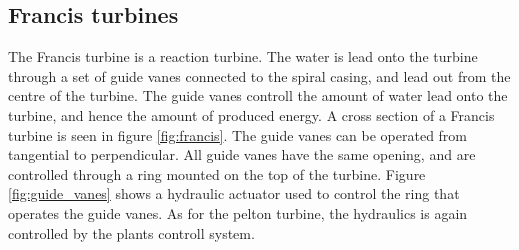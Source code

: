         
    
    \subsection{Francis turbines}\label{subsec:francis}
        The Francis turbine is a reaction turbine. The water is lead onto the turbine through a set of guide vanes connected to the spiral casing, and lead out from the centre of the turbine. The guide vanes controll the amount of water lead onto the turbine, and hence the amount of produced energy. A cross section of a Francis turbine is seen in figure \ref{fig:francis}. The guide vanes can be operated from tangential to perpendicular. All guide vanes have the same opening, and are controlled through a ring mounted on the top of the turbine. Figure \ref{fig:guide_vanes} shows a hydraulic actuator used to control the ring that operates the guide vanes. As for the pelton turbine, the hydraulics is again controlled by the plants controll system.  
        
